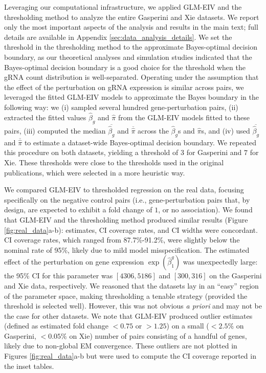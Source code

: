 \documentclass[12pt]{article}
\begin{document}
Leveraging our computational infrastructure, we applied GLM-EIV and the thresholding method to analyze the entire Gasperini and Xie datasets. We report only the most important aspects of the analysis and results in the main text; full details are available in Appendix \ref{sec:data_analysis_details}. We set the threshold in the thresholding method to the approximate Bayes-optimal decision boundary, as our theoretical analyses and simulation studies indicated that the Bayes-optimal decision boundary is a good choice for the threshold when the gRNA count distribution is well-separated. Operating under the assumption that the effect of the perturbation on gRNA expression is similar across pairs, we leveraged the fitted GLM-EIV models to approximate the Bayes boundary in the following way: we (i) sampled several hundred gene-perturbation pairs, (ii) extracted the fitted values $\hat{\beta}_g$ and $\hat{\pi}$ from the GLM-EIV models fitted to these pairs, (iii) computed the median $\overline{\hat{\beta}_g}$ and $\overline{\hat{\pi}}$ across the $\hat{\beta}_g$s and $\hat{\pi}$s, and (iv) used $\overline{\hat{\beta}_g}$ and $\overline{\hat{\pi}}$ to estimate a dataset-wide Bayes-optimal decision boundary. We repeated this procedure on both datasets, yielding a threshold of $3$ for Gasperini and $7$ for Xie. These thresholds were close to the thresholds used in the original publications, which were selected in a more heuristic way.

We compared GLM-EIV to thresholded regression on the real data, focusing specifically on the negative control pairs (i.e., gene-perturbation pairs that, by design, are expected to exhibit a fold change of $1$, or no association). We found that GLM-EIV and the thresholding method produced similar results (Figure \ref{fig:real_data}a-b): estimates, CI coverage rates, and CI widths were concordant. CI coverage rates, which ranged from 87.7\%-91.2\%, were slightly below the nominal rate of 95\%, likely due to mild model misspecification. The estimated effect of the perturbation on gene expression $\exp(\hat{\beta}_1^g)$ was unexpectedly large: the 95\% CI for this parameter was $[4306, 5186]$ and $[300, 316]$ on the Gasperini and Xie data, respectively. We reasoned that the datasets lay in an ``easy'' region of the parameter space, making thresholding a tenable strategy (provided the threshold is selected well). However, this was not obvious \textit{a priori} and may not be the case for other datasets. We note that GLM-EIV produced outlier estimates (defined as estimated fold change $<0.75$ or $>1.25$) on a small ($< 2.5 \%$ on Gasperini, $<0.05\%$ on Xie) number of pairs consisting of a handful of genes, likely due to non-global EM convergence. These outliers are not plotted in Figures \ref{fig:real_data}a-b but were used to compute the CI coverage reported in the inset tables.
\end{document}
